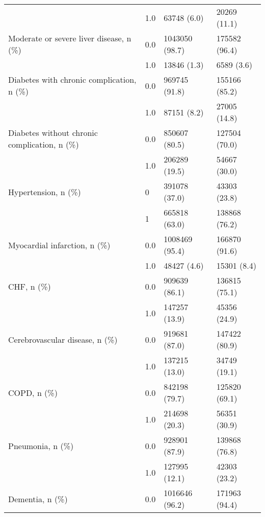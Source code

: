 \begin{tabular}{llll}
                                       & 1.0 &                    63748 (6.0) &       20269 (11.1) \\
Moderate or severe liver disease, n (\%) & 0.0 &                 1043050 (98.7) &      175582 (96.4) \\
                                       & 1.0 &                    13846 (1.3) &         6589 (3.6) \\
Diabetes with chronic complication, n (\%) & 0.0 &                  969745 (91.8) &      155166 (85.2) \\
                                       & 1.0 &                    87151 (8.2) &       27005 (14.8) \\
Diabetes without chronic complication, n (\%) & 0.0 &                  850607 (80.5) &      127504 (70.0) \\
                                       & 1.0 &                  206289 (19.5) &       54667 (30.0) \\
Hypertension, n (\%) & 0 &                  391078 (37.0) &       43303 (23.8) \\
                                       & 1 &                  665818 (63.0) &      138868 (76.2) \\
Myocardial infarction, n (\%) & 0.0 &                 1008469 (95.4) &      166870 (91.6) \\
                                       & 1.0 &                    48427 (4.6) &        15301 (8.4) \\
CHF, n (\%) & 0.0 &                  909639 (86.1) &      136815 (75.1) \\
                                       & 1.0 &                  147257 (13.9) &       45356 (24.9) \\
Cerebrovascular disease, n (\%) & 0.0 &                  919681 (87.0) &      147422 (80.9) \\
                                       & 1.0 &                  137215 (13.0) &       34749 (19.1) \\
COPD, n (\%) & 0.0 &                  842198 (79.7) &      125820 (69.1) \\
                                       & 1.0 &                  214698 (20.3) &       56351 (30.9) \\
Pneumonia, n (\%) & 0.0 &                  928901 (87.9) &      139868 (76.8) \\
                                       & 1.0 &                  127995 (12.1) &       42303 (23.2) \\
Dementia, n (\%) & 0.0 &                 1016646 (96.2) &      171963 (94.4) \\

\end{tabular}
